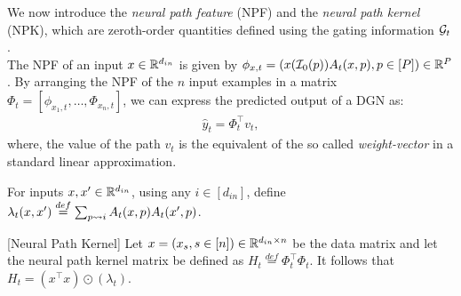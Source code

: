 We now introduce the \emph{neural path feature} (NPF) and the \emph{neural path kernel} (NPK), which are zeroth-order quantities defined using the gating information $\mathcal{G}_t$.\\
The NPF of an input $x\in \mathbb{R}^{d_{in}}$ is given by $\phi_{x,t}=(x(\mathcal{I}_0(p))A_t(x,p) ,p\in[P])\in\mathbb{R}^P$. By arranging the NPF of the $n$ input examples in a matrix $\Phi_t=\left[\phi_{x_1,t},\ldots, \Phi_{x_n,t}\right]$, we can express the predicted output of a DGN as: \begin{align}\label{eq:npfbasic}\hat{y}_t=\Phi_t^\top v_t,\end{align}
where, the value of the path $v_t$ is the equivalent of the so called \emph{weight-vector} in a standard linear approximation. 
\begin{comment}
The significance of the NPF are:\hfill\\
$1.$ \textbf{Signal-Wire Separation}: Note that $\Phi$ encodes the signal: say for a DNN with ReLU activations, the co-ordinate corresponding to path $p$ is either $x(\I_0(p))$ if the path is active for that input (i.e., $A_t(x,p)=1$) or $0$ if the path is inactive for that input  (i.e., $A_t(x,p)=0$). The value of the path thus encodes the \emph{wire}, i.e., the information contained in the weights of the network. \hfill\\
$2.$ \textbf{Deep Information Propagation:} The path view provides a novel way of looking at information propagation in DNNs, eschewing the conventional `layer-by-layer' expression for information flow.\hfill\\
$3.$ \textbf{Representation:} As a parallel to the standard linear approximation, the NPF can be regarded as the \emph{hidden feature} and $v_t$ as the weight vector.
\end{comment}
\begin{definition}\label{def:lambda}
For inputs $x,x'\in\mathbb{R}^{d_{in}}$, using any $i\in [d_{in}]$,  define $\lambda_t(x,x')\stackrel{def}{=}\sum_{p\rightsquigarrow i} A_t(x,p) A_t(x',p)$.
 \end{definition} 
\begin{lemma}\label{lm:npk}[Neural Path Kernel] 
Let $x=(x_s,s\in [n])\in\mathbb{R}^{d_{in}\times n}$ be the data matrix and let the neural path kernel matrix be defined as $H_t\stackrel{def}=\Phi^\top_t\Phi_t$. It follows that $H_t= (x^\top x)\odot(\lambda_t)$. 
\end{lemma}
